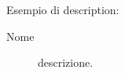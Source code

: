 
Esempio di description:

\begin{description}
    \item[Nome] descrizione.
    \label{lst:labellist}
\end{description}